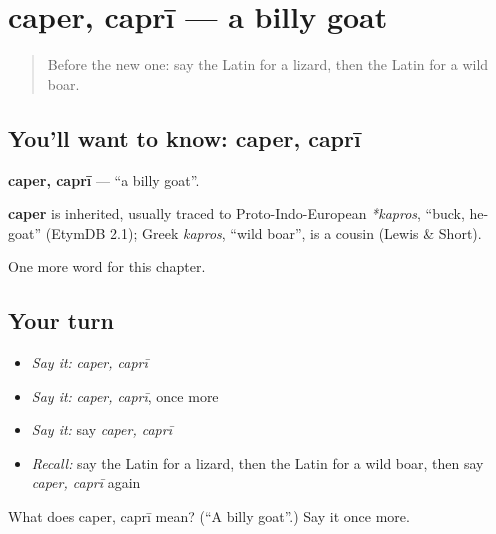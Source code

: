 \section[caper, caprī]{caper, caprī — a billy goat}

\label{lesson:LA-C224-caper}



\begin{quote}
Before the new one: say the Latin for a lizard, then the Latin for a wild boar.
\end{quote}

\subsection*{You'll want to know: caper, caprī}
\textbf{caper, caprī} — \textquotedblleft{}a billy goat\textquotedblright{}.

\begin{cousinweb}
\textbf{caper} is inherited, usually traced to Proto-Indo-European \emph{*kapros}, \textquotedblleft{}buck, he-goat\textquotedblright{} (EtymDB 2.1); Greek \emph{kapros}, \textquotedblleft{}wild boar\textquotedblright{}, is a cousin (Lewis \& Short).
\end{cousinweb}

\begin{grammarlens}[title={What you've built}]
One more word for this chapter.
\end{grammarlens}

\subsection*{Your turn}
\begin{itemize}
\raggedright
  \item \emph{Say it:} \emph{caper, caprī}
  \item \emph{Say it:} \emph{caper, caprī}, once more
  \item \emph{Say it:} say \emph{caper, caprī}
  \item \emph{Recall:} say the Latin for a lizard, then the Latin for a wild boar, then say \emph{caper, caprī} again
\end{itemize}

\begin{tcolorbox}[breakable,colback=teal!4,colframe=teal!35!black,title={Before you move on}]
What does caper, caprī mean? (\textquotedblleft{}A billy goat\textquotedblright{}.) Say it once more.
\end{tcolorbox}
